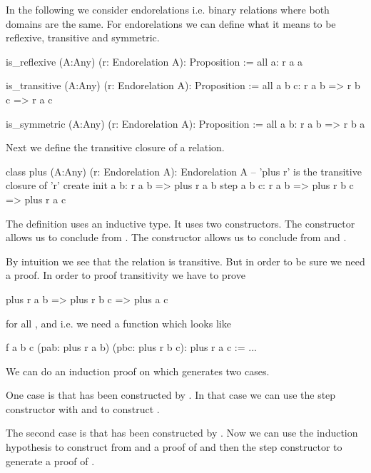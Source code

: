 In the following we consider endorelations i.e. binary relations where both
domains are the same. For endorelations we can define what it means to be
reflexive, transitive and symmetric.

\begin{alba}
  is_reflexive (A:Any) (r: Endorelation A): Proposition :=
    all a: r a a

  is_transitive (A:Any) (r: Endorelation A): Proposition :=
    all a b c: r a b => r b c => r a c

  is_symmetric (A:Any) (r: Endorelation A): Proposition :=
    all a b: r a b => r b a
\end{alba}


Next we define the transitive closure of a relation.

\begin{alba}
  class
    plus (A:Any) (r: Endorelation A): Endorelation A
      -- 'plus r' is the transitive closure of 'r'
  create
    init a b:
      r a b
      => plus r a b
    step a b c:
      r a b
      => plus r b c
      => plus r a c
\end{alba}

The definition uses an inductive type. It uses two constructors. The
 constructor allows us to conclude  from .
The  constructor allows us to conclude  from
 and .

By intuition we see that the relation  is transitive. But in
order to be sure we need a proof. In order to proof transitivity we have to
prove
%
\begin{alba}
  plus r a b => plus r b c => plus a c
\end{alba}
%
for all ,  and 
i.e. we need a function which looks like
%
\begin{alba}
  f a b c (pab: plus r a b) (pbc: plus r b c): plus r a c :=
    ...
\end{alba}
%
We can do an induction proof on  which generates two
cases.

One case is that  has been constructed
by . In that case we can use the step constructor with
 and  to construct .

The second case is that   has been constructed by . Now we can use the induction
hypothesis to construct from  and  a proof of  and then the step constructor to generate a proof of .


